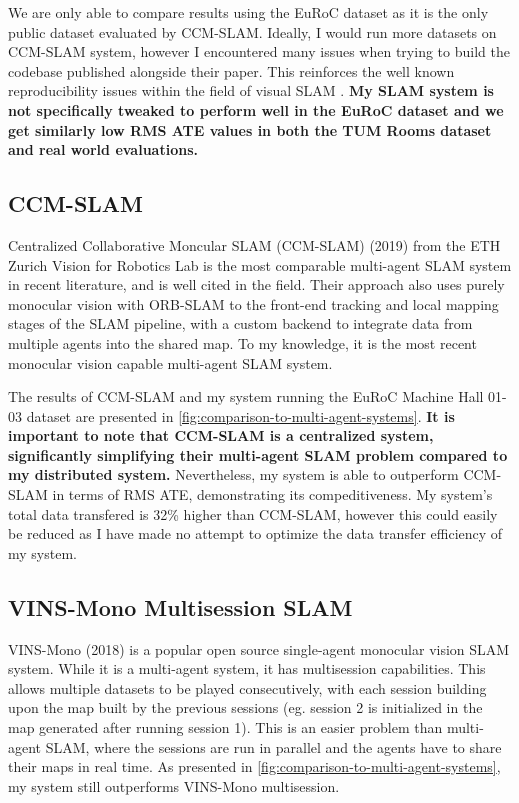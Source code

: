 We are only able to compare results using the EuRoC dataset as it is the only public dataset evaluated by CCM-SLAM. Ideally, I would run more datasets on CCM-SLAM system, however I encountered many issues when trying to build the codebase published alongside their paper. This reinforces the well known reproducibility issues within the field of visual SLAM \autocite{DBLP:journals/corr/abs-2108-01654}. \textbf{My SLAM system is not specifically tweaked to perform well in the EuRoC dataset and we get similarly low RMS ATE values in both the TUM Rooms dataset and real world evaluations.}

\subsection{CCM-SLAM}
\label{sec:ccm-slam}
Centralized Collaborative Moncular SLAM (CCM-SLAM) (2019) from the ETH Zurich Vision for Robotics Lab \autocite{schmuck2019ccm} is the most comparable multi-agent SLAM system in recent literature, and is well cited in the field. Their approach also uses purely monocular vision with ORB-SLAM to the front-end tracking and local mapping stages of the SLAM pipeline, with a custom backend to integrate data from multiple agents into the shared map. To my knowledge, it is the most recent monocular vision capable multi-agent SLAM system.

The results of CCM-SLAM and my system running the EuRoC Machine Hall 01-03 dataset are presented in \autoref{fig:comparison-to-multi-agent-systems}. \textbf{It is important to note that CCM-SLAM is a centralized system, significantly simplifying their multi-agent SLAM problem compared to my distributed system.} Nevertheless, my system is able to outperform CCM-SLAM in terms of RMS ATE, demonstrating its compeditiveness. My system's total data transfered is 32\% higher than CCM-SLAM, however this could easily be reduced as I have made no attempt to optimize the data transfer efficiency of my system.

\subsection{VINS-Mono Multisession SLAM}
VINS-Mono (2018) \autocite{8421746} is a popular open source single-agent monocular vision SLAM system. While it is a multi-agent system, it has multisession capabilities. This allows multiple datasets to be played consecutively, with each session building upon the map built by the previous sessions (eg. session 2 is initialized in the map generated after running session 1). This is an easier problem than multi-agent SLAM, where the sessions are run in parallel and the agents have to share their maps in real time. As presented in \autoref{fig:comparison-to-multi-agent-systems}, my system still outperforms VINS-Mono multisession.

